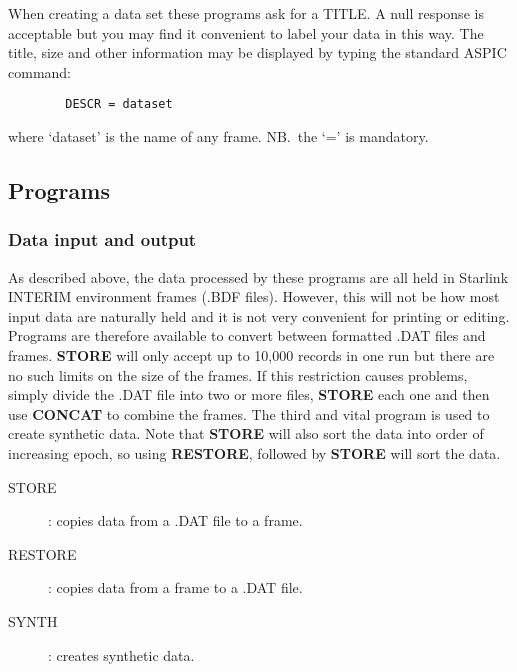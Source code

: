 When creating a data set these programs ask for a TITLE.
A null response is acceptable but you may find it convenient to label your data
in this way.
The title, size and other information may be displayed by typing the standard
ASPIC command:
\begin{verbatim}
        DESCR = dataset
\end{verbatim}
where `dataset' is the name of any frame.
NB.\ the `=' is mandatory.
\subsection {Programs}
\subsubsection {Data input and output}
As described above, the data processed by these programs are all held in
Starlink INTERIM environment frames (.BDF files).
However, this will not be how most input data are naturally held and it is not
very convenient for printing or editing.
Programs are therefore available to convert between formatted .DAT files and
frames.
{\bf STORE} will only accept up to 10,000 records in one run but there are no
such limits on the size of the frames.
If this restriction causes problems, simply divide the .DAT file into two or
more files, {\bf STORE} each one and then use {\bf CONCAT} to combine the
frames.
The third and vital program is used to create synthetic data.
Note that {\bf STORE} will also sort the data into order of increasing epoch, so
using {\bf RESTORE}, followed by {\bf STORE} will sort the data.
\begin{description}
\begin{description}
\item [STORE]: copies data from a .DAT file to a frame.
\item [RESTORE]: copies data from a frame to a .DAT file.
\item [SYNTH]: creates synthetic data.
\end{description}
\end{description}
